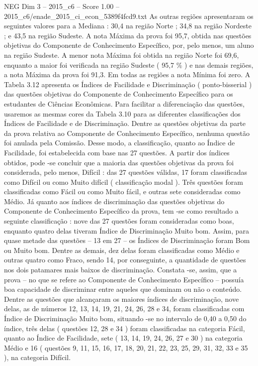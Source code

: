\begin{textsample}{NEG Dim 3 – 2015\_c6 – Score 1.00 – 2015\_c6/enade\_2015\_ci\_econ\_5389f4fcd9.txt}
As outras regiões apresentaram os seguintes valores para a Mediana : 30,4 na região Norte ; 34,8 na região Nordeste ; e 43,5 na região Sudeste.
A nota Máxima da prova foi 95,7, obtida nas questões objetivas do Componente de Conhecimento Específico, por, pelo menos, um aluno na região Sudeste.
A menor nota Máxima foi obtida na região Norte foi 69,6, enquanto a maior foi verificada na região Sudeste ( 95,7 \% ) e nas demais regiões, a nota Máxima da prova foi 91,3.
Em todas as regiões a nota Mínima foi zero.
A Tabela 3.12 apresenta os Índices de Facilidade e Discriminação ( ponto-bisserial ) das questões objetivas do Componente de Conhecimento Específico para os estudantes de Ciências Econômicas.
Para facilitar a diferenciação das questões, usaremos as mesmas cores da Tabela 3.10 para as diferentes classificações dos Índices de Facilidade e de Discriminação.
Dentre as questões objetivas da parte da prova relativa ao Componente de Conhecimento Específico, nenhuma questão foi anulada pela Comissão.
Desse modo, a classificação, quanto ao Índice de Facilidade, foi estabelecida com base nas 27 questões.
A partir dos índices obtidos, pode -se concluir que a maioria das questões objetivas da prova foi considerada, pelo menos, Difícil : das 27 questões válidas, 17 foram classificadas como Difícil ou como Muito difícil ( classificação modal ).
Três questões foram classificadas como Fácil ou como Muito fácil, e outras sete consideradas como Médio.
Já quanto aos índices de discriminação das questões objetivas do Componente de Conhecimento Específico da prova, tem -se como resultado a seguinte classificação : nove das 27 questões foram consideradas como boas, enquanto quatro delas tiveram Índice de Discriminação Muito bom.
Assim, para quase metade das questões – 13 em 27 – os Índices de Discriminação foram Bom ou Muito bom.
Dentre as demais, dez delas foram classificadas como Médio e outras quatro como Fraco, sendo 14, por conseguinte, a quantidade de questões nos dois patamares mais baixos de discriminação.
Constata -se, assim, que a prova – no que se refere ao Componente de Conhecimento Específico – possuía boa capacidade de discriminar entre aqueles que dominam ou não o conteúdo.
Dentre as questões que alcançaram os maiores índices de discriminação, nove delas, as de números 12, 13, 14, 19, 21, 24, 26, 28 e 34, foram classificadas com Índice de Discriminação Muito bom, situando -se no intervalo de 0,40 a 0,50 do índice, três delas ( questões 12, 28 e 34 ) foram classificadas na categoria Fácil, quanto ao Índice de Facilidade, sete ( 13, 14, 19, 24, 26, 27 e 30 ) na categoria Médio e 16 ( questões 9, 11, 15, 16, 17, 18, 20, 21, 22, 23, 25, 29, 31, 32, 33 e 35 ), na categoria Difícil.

\end{textsample}
